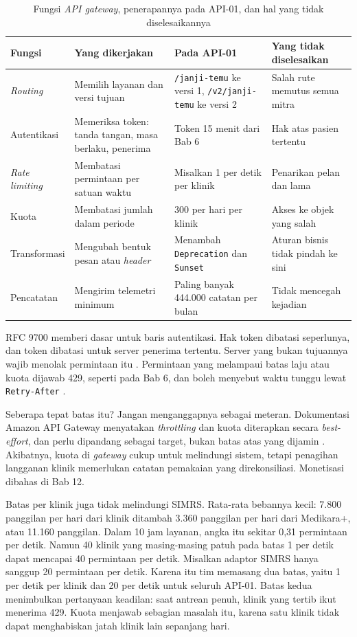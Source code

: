 \begin{table}[!htb]
  \centering
  \caption{Fungsi \textit{API gateway}, penerapannya pada API-01, dan hal yang tidak diselesaikannya}
  \label{tab:ch10-fungsi}
  \footnotesize
  \begin{tabularx}{\textwidth}{H{1.8cm}GGG}
    \hline
    \textbf{Fungsi} & \textbf{Yang dikerjakan} & \textbf{Pada API-01} & \textbf{Yang tidak diselesaikan} \\ \hline
    \textit{Routing} & Memilih layanan dan versi tujuan & \texttt{/janji-temu} ke versi 1, \texttt{/v2/janji-temu} ke versi 2 & Salah rute memutus semua mitra \\ \hline
    Autentikasi & Memeriksa token: tanda tangan, masa berlaku, penerima & Token 15 menit dari Bab 6 & Hak atas pasien tertentu \\ \hline
    \textit{Rate limiting} & Membatasi permintaan per satuan waktu & Misalkan 1 per detik per klinik & Penarikan pelan dan lama \\ \hline
    Kuota & Membatasi jumlah dalam periode & 300 per hari per klinik & Akses ke objek yang salah \\ \hline
    Transformasi & Mengubah bentuk pesan atau \textit{header} & Menambah \texttt{Deprecation} dan \texttt{Sunset} & Aturan bisnis tidak pindah ke sini \\ \hline
    Pencatatan & Mengirim telemetri minimum & Paling banyak 444.000 catatan per bulan & Tidak mencegah kejadian \\ \hline
  \end{tabularx}
\end{table}

RFC 9700 memberi dasar untuk baris autentikasi. Hak token dibatasi seperlunya, dan token dibatasi untuk server penerima
tertentu. Server yang bukan tujuannya wajib menolak permintaan itu \cite{rfc9700}. Permintaan yang melampaui batas laju
atau kuota dijawab 429, seperti pada Bab 6, dan boleh menyebut waktu tunggu lewat \texttt{Retry-After}
\cite{rfc6585}.

Seberapa tepat batas itu? Jangan menganggapnya sebagai meteran. Dokumentasi Amazon API Gateway menyatakan
\textit{throttling} dan kuota diterapkan secara \textit{best-effort}, dan perlu dipandang sebagai target, bukan batas
atas yang dijamin \cite{aws-throttling}. Akibatnya, kuota di \textit{gateway} cukup untuk melindungi sistem, tetapi
penagihan langganan klinik memerlukan catatan pemakaian yang direkonsiliasi. Monetisasi dibahas di Bab 12.

Batas per klinik juga tidak melindungi SIMRS. Rata-rata bebannya kecil: 7.800 panggilan per hari dari klinik ditambah
3.360 panggilan per hari dari Medikara+, atau 11.160 panggilan. Dalam 10 jam layanan, angka itu sekitar 0,31 permintaan
per detik. Namun 40 klinik yang masing-masing patuh pada batas 1 per detik dapat mencapai 40 permintaan per detik.
Misalkan adaptor SIMRS hanya sanggup 20 permintaan per detik. Karena itu tim memasang dua batas, yaitu 1 per detik per
klinik dan 20 per detik untuk seluruh API-01. Batas kedua menimbulkan pertanyaan keadilan: saat antrean penuh, klinik
yang tertib ikut menerima 429. Kuota menjawab sebagian masalah itu, karena satu klinik tidak dapat menghabiskan jatah
klinik lain sepanjang hari.

